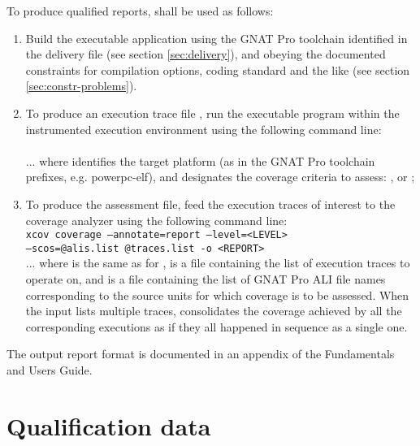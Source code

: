 \documentclass {report}
\begin{document}
To produce qualified reports, \xcov{} shall be used as follows:

\begin{enumerate}
\item Build the executable application using the GNAT Pro toolchain
  identified in the delivery file (see section \ref{sec:delivery}), and
  obeying the documented constraints for compilation options, coding
  standard and the like (see section \ref{sec:constr-problems}).

\item To produce an execution trace file , run the 
  executable program within the instrumented execution environment using the
  following command line:\\

 \\

... where  identifies the target platform (as in the GNAT Pro
toolchain prefixes, e.g.  powerpc-elf), and  designates the
coverage criteria to assess: ,  or ;

\item To produce the assessment  file, feed the execution traces
  of interest to the coverage analyzer using the following command line:\\

\texttt{xcov coverage --annotate=report --level=<LEVEL> \\
  --scos=@alis.list @traces.list -o <REPORT>} \\

... where  is the same as for ,  is a
file containing the list of execution traces to operate on, and 
is a file containing the list of GNAT Pro ALI file names corresponding to the
source units for which coverage is to be assessed.
%
When the  input lists multiple traces, \xcov{} consolidates the
coverage achieved by all the corresponding executions as if they all happened
in sequence as a single one.

\end{enumerate}

The output report format is documented in an appendix of the \xcov{}
Fundamentals and Users Guide.

\chapter{Qualification data}
\end{document}
